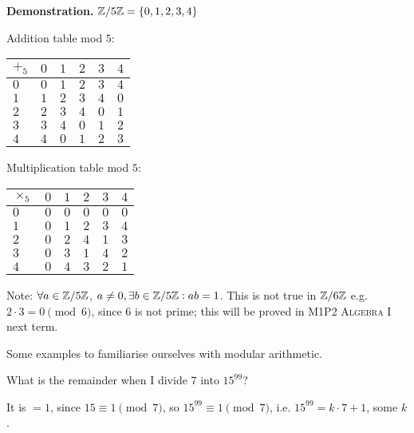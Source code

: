 \documentclass[twoside]{scrartcl}
\begin{document}
\textbf{Demonstration.} $\mathbb{Z}/ 5\mathbb{Z} = \{0,1,2,3,4\}$

Addition table mod $5$: 

\def\arraystretch{1.2}
\begin{table}[h]
\centering 
    \begin{tabular}{l||l|l|l|l|l}
     $+_5$ & $0$ & $1$ & $2$ & $3$ & $4$  \\ \hline \hline 
    $0$ & $0$ & $1$ & $2$ & $3$ & $4$ \\ \hline 
    $1$ & $1$ & $2$ & $3$ & $4$ & $0$ \\ \hline 
   $2$ & $2$ & $3$ & $4$ & $0$ & $1$ \\ \hline 
    $3$ & $3$ & $4$ & $0$ & $1$ & $2$ \\\hline 
    $4$ & $4$ & $0$ & $1$ & $2$ & $3$ \\    
    \end{tabular}
\end{table}

Multiplication table mod $5$: 
\begin{table}[h]
\centering
    \begin{tabular}{l||l|l|l|l|l}
    $\times_5$ & $0$ & $1$ & $2$ & $3$ & $4$  \\ \hline \hline 
    $0$ & $0$ & $0$ & $0$ & $0$ & $0$ \\ \hline 
    $1$ & $0$ & $1$ & $2$ & $3$ & $4$ \\ \hline 
   $2$ & $0$ & $2$ & $4$ & $1$ & $3$ \\ \hline 
    $3$ & $0$ & $3$ & $1$ & $4$ & $2$ \\\hline 
    $4$ & $0$ & $4$ & $3$ & $2$ & $1$ \\    
    \end{tabular}
\end{table}

Note: $\forall a \in \mathbb{Z} / 5\mathbb{Z}$, $a \neq 0, \exists b \in \mathbb{Z}/ 5 \mathbb{Z} : ab = 1$. This is not true in $\mathbb{Z} / 6\mathbb{Z}$ e.g. $2\cdot 3 = 0\pmod{6}$, since $6$ is not prime; this will be proved in \textsc{M1P2 Algebra I} next term.

Some examples to familiarise ourselves with modular arithmetic. \\

\begin{example}
What is the remainder when I divide $7$ into $15^{99}$? 

It is $= 1$, since $15 \equiv 1\pmod{7}$, so $15^{99} \equiv 1 \pmod{7}$, i.e. $15^{99} = k\cdot 7 + 1$, some $k$.
\end{example}\vspace*{5pt}
\end{document}
